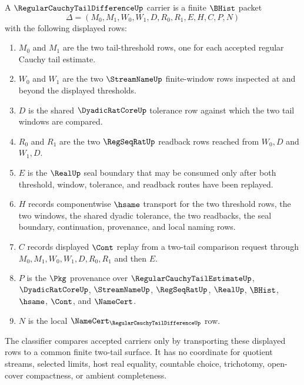 \begin{definition}
\label{def:regular-cauchy-tail-difference-carrier}
A $\RegularCauchyTailDifferenceUp$ carrier is a finite $\BHist$ packet
$$
\Delta=(M_0,M_1,W_0,W_1,D,R_0,R_1,E,H,C,P,N)
$$
with the following displayed rows:
\begin{enumerate}
\item $M_0$ and $M_1$ are the two tail-threshold rows, one for each accepted
regular Cauchy tail estimate.
\item $W_0$ and $W_1$ are the two $\StreamNameUp$ finite-window rows inspected
at and beyond the displayed thresholds.
\item $D$ is the shared $\DyadicRatCoreUp$ tolerance row against which the two
tail windows are compared.
\item $R_0$ and $R_1$ are the two $\RegSeqRatUp$ readback rows reached from
$W_0,D$ and $W_1,D$.
\item $E$ is the $\RealUp$ seal boundary that may be consumed only after both
threshold, window, tolerance, and readback routes have been replayed.
\item $H$ records componentwise $\hsame$ transport for the two threshold rows,
the two windows, the shared dyadic tolerance, the two readbacks, the seal
boundary, continuation, provenance, and local naming rows.
\item $C$ records displayed $\Cont$ replay from a two-tail comparison request
through $M_0,M_1,W_0,W_1,D,R_0,R_1$ and then $E$.
\item $P$ is the $\Pkg$ provenance over $\RegularCauchyTailEstimateUp$,
$\DyadicRatCoreUp$, $\StreamNameUp$, $\RegSeqRatUp$, $\RealUp$, $\BHist$,
$\hsame$, $\Cont$, and $\NameCert$.
\item $N$ is the local $\NameCert_{\RegularCauchyTailDifferenceUp}$ row.
\end{enumerate}
The classifier compares accepted carriers only by transporting these displayed
rows to a common finite two-tail surface. It has no coordinate for quotient
streams, selected limits, host real equality, countable choice, trichotomy,
open-cover compactness, or ambient completeness.
\end{definition}

